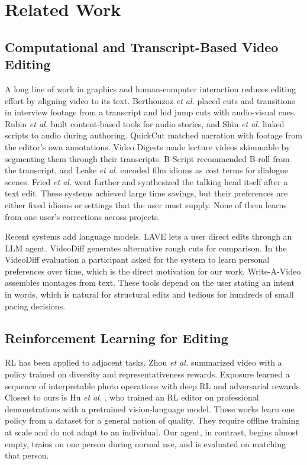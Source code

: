 \documentclass{ieeeaccess}
\begin{document}
\section{Related Work}
\label{sec:related}

\subsection{Computational and Transcript-Based Video Editing}
A long line of work in graphics and human-computer interaction reduces editing effort by aligning video to its text. Berthouzoz \emph{et al.} \cite{berthouzoz2012} placed cuts and transitions in interview footage from a transcript and hid jump cuts with audio-visual cues. Rubin \emph{et al.} \cite{rubin2013} built content-based tools for audio stories, and Shin \emph{et al.} \cite{shin2016} linked scripts to audio during authoring. QuickCut \cite{truong2016} matched narration with footage from the editor's own annotations. Video Digests \cite{pavel2014} made lecture videos skimmable by segmenting them through their transcripts. B-Script \cite{huber2019} recommended B-roll from the transcript, and Leake \emph{et al.} \cite{leake2017} encoded film idioms as cost terms for dialogue scenes. Fried \emph{et al.} \cite{fried2019} went further and synthesized the talking head itself after a text edit. These systems achieved large time savings, but their preferences are either fixed idioms or settings that the user must supply. None of them learns from one user's corrections across projects.

Recent systems add language models. LAVE \cite{wang2024lave} lets a user direct edits through an LLM agent. VideoDiff \cite{huh2025videodiff} generates alternative rough cuts for comparison. In the VideoDiff evaluation a participant asked for the system to learn personal preferences over time, which is the direct motivation for our work. Write-A-Video \cite{wang2019write} assembles montages from text. These tools depend on the user stating an intent in words, which is natural for structural edits and tedious for hundreds of small pacing decisions.

\subsection{Reinforcement Learning for Editing}
RL has been applied to adjacent tasks. Zhou \emph{et al.} \cite{zhou2018summarization} summarized video with a policy trained on diversity and representativeness rewards. Exposure \cite{hu2018exposure} learned a sequence of interpretable photo operations with deep RL and adversarial rewards. Closest to ours is Hu \emph{et al.} \cite{hu2023rlediting}, who trained an RL editor on professional demonstrations with a pretrained vision-language model. These works learn one policy from a dataset for a general notion of quality. They require offline training at scale and do not adapt to an individual. Our agent, in contrast, begins almost empty, trains on one person during normal use, and is evaluated on matching that person.
\end{document}

